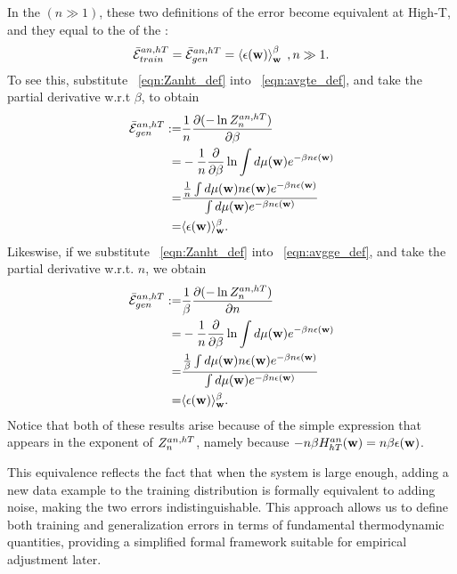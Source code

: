 {In the \ThermodynamicLimit $(n \gg 1)$, these two definitions of the error become equivalent at High-T,
and they equal to the \ThermalAverage of the \EffectivePotential:
\begin{align}
  \bar{\mathcal{E}}_{train}^{an, hT} = \bar{\mathcal{E}}_{gen}^{an, hT} = \left\langle \epsilon({\mathbf{w}}) \right\rangle_{\mathbf w}^{\beta}\;,n\gg 1 .
\end{align}
To see this, substitute \EQN~\ref{eqn:Zanht_def} into \EQN~\ref{eqn:avgte_def}, and take the partial derivative w.r.t $\beta$, to obtain
\begin{align}
  \label{eqn:avgte_anhT}
  \bar{\mathcal{E}}_{gen}^{an, hT} :=&\frac{1}{n}\dfrac{\partial (-\ln Z^{an,hT}_{n})}{\partial \beta}  \\ \nonumber
   =& - \dfrac{1}{n}\dfrac{\partial}{\partial \beta}\ln\int d\mu({\mathbf{w}})e^{-\beta n\epsilon({\mathbf{w}})} \\  \nonumber
   =&  \dfrac{
              \tfrac{1}{n}  \int  d\mu({\mathbf{w}}) n\epsilon({\mathbf{w}}) e^{-\beta n\epsilon({\mathbf{w}})} 
             }{
              \int  d\mu({\mathbf{w}}) e^{-\beta n\epsilon({\mathbf{w}})} 
   } \\ \nonumber
   =&\langle\epsilon({\mathbf{w}}) \rangle_{{\mathbf{w}}}^{\beta} .
  \end{align}
Likeswise, if we substitute \EQN~\ref{eqn:Zanht_def} into \EQN~\ref{eqn:avgge_def}, and take the partial derivative w.r.t. $n$, we obtain
\begin{align}
  \label{eqn:avgte_anhT}
    \bar{\mathcal{E}}_{gen}^{an, hT}  :=& \frac{1}{\beta}\dfrac{\partial (-\ln Z^{an,hT}_{n})}{\partial n} \\ \nonumber
    =& - \dfrac{1}{n}\dfrac{\partial}{\partial \beta}\ln\int d\mu({\mathbf{w}})e^{-\beta n\epsilon({\mathbf{w}})} \\  \nonumber
   =&  \dfrac{
              \tfrac{1}{\beta}  \int  d\mu({\mathbf{w}}) n\epsilon({\mathbf{w}}) e^{-\beta n\epsilon({\mathbf{w}})} 
             }{
     \int  d\mu({\mathbf{w}}) e^{-\beta n\epsilon({\mathbf{w}})} 
   } \\ \nonumber
   =&\langle\epsilon({\mathbf{w}}) \rangle_{{\mathbf{w}}}^{\beta} .
\end{align}
Notice that both of these results arise because of the simple expression that appears in the exponent of $Z^{an,hT}_{n}$, namely because $-n\beta H^{an}_{hT}({\mathbf{w}})=n\beta\epsilon({\mathbf{w}})$.


This equivalence reflects the fact that when the system is large enough, adding a new data example to the
training distribution is formally equivalent to adding noise, making the two errors indistinguishable.
This approach allows us to define both training and generalization errors in terms of fundamental thermodynamic quantities,
providing a simplified formal framework suitable for empirical adjustment later.

}
